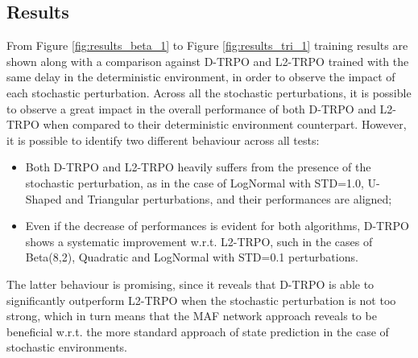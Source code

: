         \subsection{Results}
        \label{sub:stoch_env_res}
            From Figure \ref{fig:results_beta_1} to Figure \ref{fig:results_tri_1} training results are shown along with a comparison against D-TRPO and L2-TRPO trained with the same delay in the deterministic environment, in order to observe the impact of each stochastic perturbation. Across all the stochastic perturbations, it is possible to observe a great impact in the overall performance of both D-TRPO and L2-TRPO when compared to their deterministic environment counterpart. However, it is possible to identify two different behaviour across all tests:
            \begin{itemize}
                \setlength\itemsep{0.05em}
                \item Both D-TRPO and L2-TRPO heavily suffers from the presence of the stochastic perturbation, as in the case of LogNormal with STD=1.0, U-Shaped and Triangular perturbations, and their performances are aligned;
                \item Even if the decrease of performances is evident for both algorithms, D-TRPO shows a systematic improvement w.r.t. L2-TRPO, such in the cases of Beta(8,2), Quadratic and LogNormal with STD=0.1 perturbations.
            \end{itemize}
            The latter behaviour is promising, since it reveals that D-TRPO is able to significantly outperform L2-TRPO when the stochastic perturbation is not too strong, which in turn means that the MAF network approach reveals to be beneficial w.r.t. the more standard approach of state prediction in the case of stochastic environments. 
            
